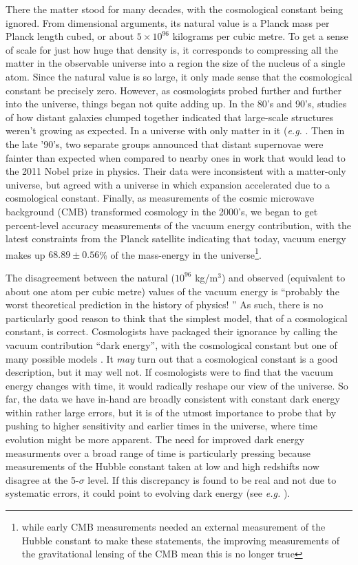 \documentclass[letterpaper,11pt,preprint]{aastex}
\begin{document}
There the matter stood for many decades, with the cosmological
constant being ignored.  From dimensional arguments, its natural value
is a Planck mass per Planck length cubed, or about $5\times 10^{96}$
kilograms per cubic metre.  To get a sense of scale for just how huge
that density is, it corresponds to compressing all the matter in the
observable universe into a region the size of the nucleus of a single
atom.  Since the natural value is so large, it only made sense that
the cosmological constant be precisely zero.  However, as cosmologists
probed further and further into the universe, things began not quite
adding up.  In the 80's and 90's, studies of how distant galaxies
clumped together indicated that large-scale structures weren't growing
as expected.  In a universe with only matter in it ({\textit{e.g.}
  \citet{Park94}}.  Then in the late '90's, two separate groups
announced that distant supernovae were fainter than expected when
compared to nearby ones \citep{Riess98,Perlmutter99} in work that
would lead to the 2011 Nobel prize in physics.  Their data were
inconsistent with a matter-only universe, but agreed with a universe
in which expansion accelerated due to a cosmological constant.
Finally, as measurements of the cosmic microwave background (CMB)
transformed cosmology in the 2000's, we began to get percent-level
accuracy measurements of the vacuum energy contribution, with the
latest constraints from the Planck satellite indicating that today,
vacuum energy makes up $68.89\pm0.56$\% of the mass-energy in the
universe\footnote{while early CMB measurements needed an external
  measurement of the Hubble constant to make these statements, the
  improving measurements of the gravitational lensing of the CMB mean
  this is no longer true}\citep{Planck2018Params}.

The disagreement between the natural ($10^{96}$ kg/m$^3$) and observed
(equivalent to about one atom per cubic metre) values of the vacuum
energy is ``probably the worst theoretical prediction in the history of physics! \citep{Hobson06}''
  As such, there is no particularly
good reason to think that the simplest model, that of a cosmological
constant, is correct.  Cosmologists have packaged their ignorance by
calling the vacuum contribution ``dark energy'', with the cosmological
constant but one of many possible models \citep{Ratra88,Steinhardt99}.
It {\textit{may}} turn out that a cosmological
constant is a good description, but it may well not.  If cosmologists
were to find that the vacuum energy changes with time, it would
radically reshape our view of the universe.  So far, the data we have
in-hand are broadly consistent with constant dark energy within rather large
errors, but it is of the utmost importance to probe that by pushing to
higher sensitivity and earlier times in the universe, where time
evolution might be more apparent.  The need for improved dark energy
measurments over a broad range of time is particularly pressing because measurements of the
Hubble constant taken at low and high redshifts now disagree at the
5-$\sigma$ level.  If this discrepancy is found to be real and not due
to systematic errors, it could point to evolving dark energy (see
{\it{e.g.}} \citet{Freedman2017}).
\end{document}
